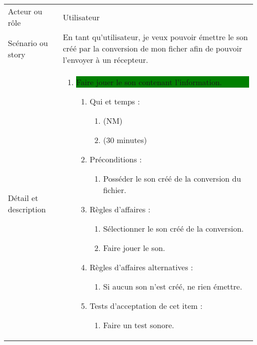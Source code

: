 \begin{longtable}{|l|p{}|}
\hline
    \rowcolor{Gray}
    \multicolumn{2}{|l|}{5} \\
\hline
    Acteur ou rôle & Utilisateur \\
\hline
    Scénario ou story & En tant qu'utilisateur, 
      je veux pouvoir émettre le son créé par la conversion de mon ficher afin de pouvoir l'envoyer à un récepteur. \\
\hline
    Détail et description &
        \begin{enumerate}[label*=\arabic*.]
            \item \colorbox{Green}{\parbox{13cm}{ Faire jouer le son contenant l'information.}}
            \begin{enumerate}[label*=\arabic*.]
                    \item Qui et temps :
                    \begin{enumerate}[label*=\arabic*.]
                        \item (NM)
                        \item (30 minutes)
                    \end{enumerate}
                    \item Préconditions : 
                    \begin{enumerate}[label*=\arabic*.]
                        \item Posséder le son créé de la conversion du fichier.
                    \end{enumerate}
                    \item Règles d’affaires :
                    \begin{enumerate}[label*=\arabic*.]
                        \item Sélectionner le son créé de la conversion.
                        \item Faire jouer le son.
                    \end{enumerate}
                    \item Règles d’affaires alternatives :
                    \begin{enumerate}[label*=\arabic*.]
                        \item Si aucun son n'est créé, ne rien émettre.
                    \end{enumerate}
                    \item Tests d'acceptation de cet item :
                    \begin{enumerate}[label*=\arabic*.]
                        \item Faire un test sonore.

\end{enumerate}
\end{enumerate}
\end{enumerate}
\end{longtable}
